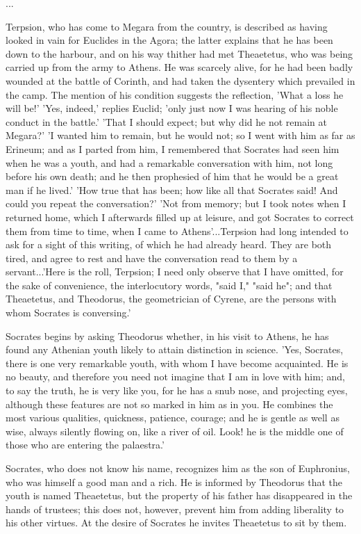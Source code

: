 ...

Terpsion, who has come to Megara from the country, is described as
having looked in vain for Euclides in the Agora; the latter explains
that he has been down to the harbour, and on his way thither had met
Theaetetus, who was being carried up from the army to Athens. He was
scarcely alive, for he had been badly wounded at the battle of Corinth,
and had taken the dysentery which prevailed in the camp. The mention of
his condition suggests the reflection, 'What a loss he will be!' 'Yes,
indeed,' replies Euclid; 'only just now I was hearing of his noble
conduct in the battle.' 'That I should expect; but why did he not remain
at Megara?' 'I wanted him to remain, but he would not; so I went with
him as far as Erineum; and as I parted from him, I remembered that
Socrates had seen him when he was a youth, and had a remarkable
conversation with him, not long before his own death; and he then
prophesied of him that he would be a great man if he lived.' 'How true
that has been; how like all that Socrates said! And could you repeat the
conversation?' 'Not from memory; but I took notes when I returned home,
which I afterwards filled up at leisure, and got Socrates to correct
them from time to time, when I came to Athens'...Terpsion had long
intended to ask for a sight of this writing, of which he had already
heard. They are both tired, and agree to rest and have the conversation
read to them by a servant...'Here is the roll, Terpsion; I need
only observe that I have omitted, for the sake of convenience, the
interlocutory words, "said I," "said he"; and that Theaetetus, and
Theodorus, the geometrician of Cyrene, are the persons with whom
Socrates is conversing.'

Socrates begins by asking Theodorus whether, in his visit to Athens, he
has found any Athenian youth likely to attain distinction in science.
'Yes, Socrates, there is one very remarkable youth, with whom I have
become acquainted. He is no beauty, and therefore you need not imagine
that I am in love with him; and, to say the truth, he is very like you,
for he has a snub nose, and projecting eyes, although these features are
not so marked in him as in you. He combines the most various qualities,
quickness, patience, courage; and he is gentle as well as wise, always
silently flowing on, like a river of oil. Look! he is the middle one of
those who are entering the palaestra.'

Socrates, who does not know his name, recognizes him as the son of
Euphronius, who was himself a good man and a rich. He is informed by
Theodorus that the youth is named Theaetetus, but the property of his
father has disappeared in the hands of trustees; this does not, however,
prevent him from adding liberality to his other virtues. At the desire
of Socrates he invites Theaetetus to sit by them.

